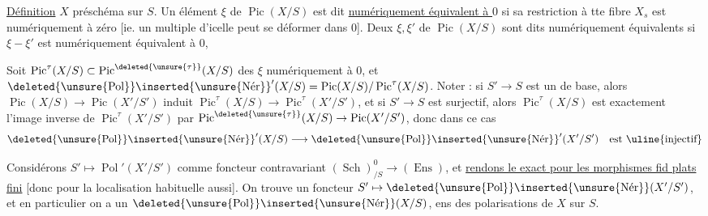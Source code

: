 \uline{Définition} $X$ préschéma sur $S$. Un élément $\xi$ de $\operatorname{Pic}(X/S)$ est dit \uline{numériquement équivalent à $0$} si sa restriction à tte fibre $X_s$ est numériquement  à zéro [ie. un multiple d'icelle peut se déformer dans $0$]. Deux  $\xi,\xi'$ de $\operatorname{Pic}(X/S)$ sont dits numériquement équivalents si $\xi-\xi'$ est numériquement équivalent à $0$,

Soit $\operatorname{Pic}^{\tau}(X/S)\subset\operatorname{Pic}^{\deleted{\unsure{\tau}}}(X/S)$ des $\xi$ numériquement  à $0$, et $\deleted{\unsure{\operatorname{Pol}}}\inserted{\unsure{\operatorname{N\acute{e}r}}}'(X/S)=\operatorname{Pic}(X/S)/\operatorname{Pic}^{\tau}(X/S)$. Noter : si  $S'\to S$ est un  de base, alors $\operatorname{Pic}(X/S)\to\operatorname{Pic}(X'/S')$ induit $\operatorname{Pic}^{\tau}(X/S)\to\operatorname{Pic}^{\tau}(X'/S')$, et si $S'\to S$ est surjectif, alors  $\operatorname{Pic}^{\tau}(X/S)$ est exactement l'image inverse de $\operatorname{Pic}^{\tau}(X'/S')$ par $\operatorname{Pic}^{\deleted{\unsure{\tau}}}(X/S)\to\operatorname{Pic}(X'/S')$, donc dans ce cas
\[
\deleted{\unsure{\operatorname{Pol}}}\inserted{\unsure{\operatorname{N\acute{e}r}}}'(X/S)\longrightarrow\deleted{\unsure{\operatorname{Pol}}}\inserted{\unsure{\operatorname{N\acute{e}r}}}'(X'/S')\quad\text{est \uline{injectif}}
\]

Considérons $S'\mapsto\operatorname{Pol}'(X'/S')$ comme foncteur contravariant $(\operatorname{Sch})^0_{/S}\longrightarrow(\operatorname{Ens})$, et \uline{rendons le exact pour les morphismes fid plats   fini} [donc pour la localisation habituelle aussi]. On trouve un foncteur $S'\mapsto\deleted{\unsure{\operatorname{Pol}}}\inserted{\unsure{\operatorname{N\acute{e}r}}}(X'/S')$, et en particulier on a un  $\deleted{\unsure{\operatorname{Pol}}}\inserted{\unsure{\operatorname{N\acute{e}r}}}(X/S)$, ens des polarisations de $X$ sur $S$.
